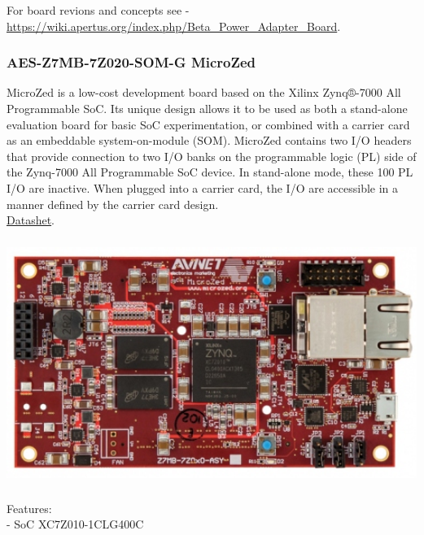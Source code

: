 For board revions and concepts see - \href{https://wiki.apertus.org/index.php/Beta_Power_Adapter_Board}{https://wiki.apertus.org/index.php/Beta\_Power\_Adapter\_Board}.\\







\subsubsection{AES-Z7MB-7Z020-SOM-G MicroZed}

MicroZed is a low-cost development board based on the Xilinx Zynq®-7000 All Programmable SoC. Its unique design allows it to be used as both a stand-alone evaluation board for basic SoC experimentation, or combined with a carrier card as an embeddable system-on-module (SOM). MicroZed contains two I/O headers that provide connection to two I/O banks on the programmable logic (PL) side of the Zynq-7000 All Programmable SoC device. In stand-alone mode, these 100 PL I/O are inactive. When plugged into a carrier card, the I/O are accessible in a manner defined by the carrier card design.\\

\href{https://wiki.apertus.org/index.php/File:AES-Z7MB-7Z020-SOM-G_MicroZed_Datasheet.pdf}{Datashet}.\\


\begin{center}
\includegraphics[height=8cm]{images/MicroZed}
\end{center}


Features:\\


- SoC XC7Z010-1CLG400C\\
    
